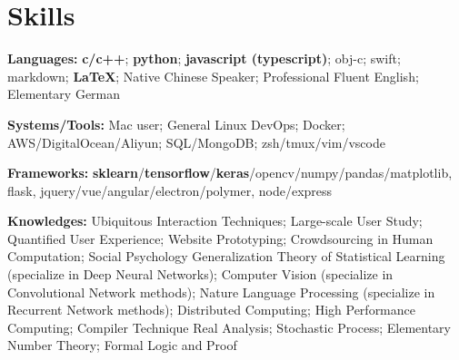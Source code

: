 \section{\textbf{Skills}}
\resumeSubHeadingListStart
\item{
  \textbf{Languages:}{ \textbf{c/c++}; \textbf{python}; \textbf{javascript (typescript)}; obj-c; swift; markdown; \textbf{\LaTeX}; Native Chinese Speaker; Professional Fluent English; Elementary German}
}
\item{
 \textbf{Systems/Tools:}{ Mac user; General Linux DevOps; Docker; AWS/DigitalOcean/Aliyun; SQL/MongoDB; zsh/tmux/vim/vscode}
}
\item{
 \textbf{Frameworks:}{ \textbf{sklearn}/\textbf{tensorflow}/\textbf{keras}/opencv/numpy/pandas/matplotlib, flask, jquery/vue/angular/electron/polymer, node/express}
}
\item{
  \textbf{Knowledges:}{ 
    \resumeItemListStart
       { Ubiquitous Interaction Techniques; Large-scale User Study; Quantified User Experience; Website Prototyping; Crowdsourcing in Human Computation; Social Psychology}
       { Generalization Theory of Statistical Learning (specialize in Deep Neural Networks); Computer Vision (specialize in Convolutional Network methods); Nature Language Processing (specialize in Recurrent Network methods); Distributed Computing; High Performance Computing; Compiler Technique}
       { Real Analysis; Stochastic Process; Elementary Number Theory; Formal Logic and Proof}
   \resumeItemListEnd
  }
}
\resumeSubHeadingListEnd